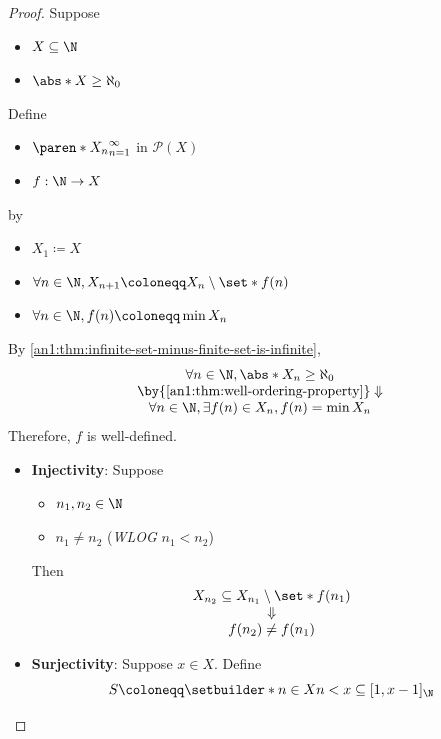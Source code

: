 \begin{proof}
  Suppose
  \begin{itemize}
    \item $X \subseteq \N$
    \item $\abs*{X} \geq \aleph_{0}$
  \end{itemize}
  Define
  \begin{itemize}
    \item $\paren*{X_{n}}_{n = 1}^{\infty}$ in $\mathcal{P}(X)$
    \item $f: \N \to X$
  \end{itemize}
  by
  \begin{itemize}
    \item $X_{1} \coloneqq X$
    \item $\forall n \in \N, X_{n + 1} \coloneqq X_{n} \setminus \set*{f(n)}$
    \item $\forall n \in \N, f(n) \coloneqq \min X_{n}$
  \end{itemize}
  By \cref{an1:thm:infinite-set-minus-finite-set-is-infinite},
  \[
    \begin{array}{c}
      \forall n \in \N, \abs*{X_{n}} \geq \aleph_{0}              \\
      \by{\Cref{an1:thm:well-ordering-property}} \Downarrow       \\
      \forall n \in \N, \exists f(n) \in X_{n}, f(n) = \min X_{n} \\
    \end{array}
  \]
  Therefore, $f$ is well-defined.
  \begin{itemize}
    \item \textbf{Injectivity}: Suppose
          \begin{itemize}
            \item $n_{1}, n_{2} \in \N$
            \item $n_{1} \neq n_{2}$ (\emph{WLOG} $n_{1} < n_{2}$)
          \end{itemize}
          Then
          \[
            \begin{array}{c}
              X_{n_{2}} \subseteq X_{n_{1}} \setminus \set*{f(n_{1})} \\
              \Downarrow                                              \\
              f(n_{2}) \neq f(n_{1})
            \end{array}
          \]
    \item \textbf{Surjectivity}: Suppose $x \in X$. Define
          \[
            S \coloneqq \setbuilder*{n \in X}{n < x} \subseteq [1, x - 1]_{\N}
\]
\end{itemize}
\end{proof}

